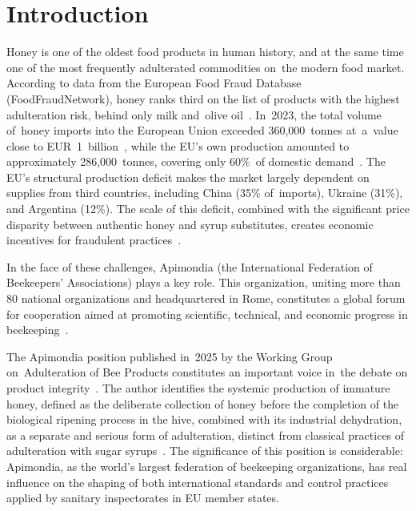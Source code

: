 
\section{Introduction}

Honey is one of the oldest food products in human history, and at
the same time one of the most frequently adulterated commodities
on~the modern food market. According to data from the European Food
Fraud Database (FoodFraudNetwork), honey ranks third on the list of
products with the highest adulteration risk, behind only milk
and~olive oil~\cite{apimondia_fraud_v2}. In~2023, the total volume
of~honey imports into the European Union exceeded 360,000~tonnes
at~a~value close to EUR~1~billion~\cite{cbi2024}, while the EU's own
production amounted to approximately 286,000~tonnes, covering
only 60\%~of domestic demand~\cite{pollinatorhub2025}.
The EU's structural production deficit makes the market largely
dependent on supplies from third countries, including China (35\%
of~imports), Ukraine (31\%), and Argentina (12\%).
The scale of this deficit, combined with the significant price
disparity between authentic honey and syrup substitutes, creates
economic incentives for fraudulent practices~\cite{apimondia_fraud_v2}.

In the face of these challenges, Apimondia (the International
Federation of Beekeepers' Associations) plays a key role. This
organization, uniting more than 80 national organizations and
headquartered in Rome, constitutes a global forum for cooperation
aimed at promoting scientific, technical, and economic progress
in beekeeping~\cite{apimondia_web}.

The Apimondia position published in~2025 by the Working Group
on~Adulteration of Bee Products constitutes an important voice
in~the debate on product integrity~\cite{garcia2025}.
The author identifies the systemic production of immature honey,
defined as the deliberate collection of honey before the completion
of the biological ripening process in the hive, combined with its
industrial dehydration, as a separate and serious form of adulteration,
distinct from classical practices of adulteration with sugar
syrups~\cite{garcia2025}.
The significance of this position is considerable: Apimondia, as the
world's largest federation of beekeeping organizations, has real
influence on the shaping of both international standards and control
practices applied by sanitary inspectorates in EU member states.

